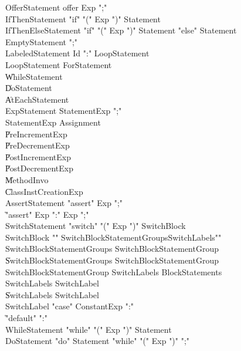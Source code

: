 {\begin{grammar}

 OfferStatement  \: offer Exp \xcd";"\\
 IfThenStatement  \: \xcd"if" \xcd"(" Exp \xcd")" Statement\\
 IfThenElseStatement  \: \xcd"if" \xcd"(" Exp \xcd")" Statement  \xcd"else" Statement \\
 EmptyStatement  \: \xcd";"\\
 LabeledStatement  \: Id \xcd":" LoopStatement\\
 LoopStatement  \: ForStatement\\
    \| WhileStatement\\
    \| DoStatement\\
    \| AtEachStatement\\
 ExpStatement  \: StatementExp \xcd";"\\
 StatementExp  \: Assignment\\
    \| PreIncrementExp\\
    \| PreDecrementExp\\
    \| PostIncrementExp\\
    \| PostDecrementExp\\
    \| MethodInvo\\
    \| ClassInstCreationExp\\
 AssertStatement  \: \xcd"assert" Exp \xcd";"\\
    \| \xcd"assert" Exp  \xcd":" Exp  \xcd";"\\
 SwitchStatement  \: \xcd"switch" \xcd"(" Exp \xcd")" SwitchBlock\\
 SwitchBlock  \: \xcd"{" SwitchBlockStatementGroups\opt SwitchLabels\opt \xcd"}"\\
 SwitchBlockStatementGroups  \: SwitchBlockStatementGroup\\
    \| SwitchBlockStatementGroups SwitchBlockStatementGroup\\
 SwitchBlockStatementGroup  \: SwitchLabels BlockStatements\\
 SwitchLabels  \: SwitchLabel\\
    \| SwitchLabels SwitchLabel\\
 SwitchLabel  \: \xcd"case" ConstantExp \xcd":"\\
    \| \xcd"default" \xcd":"\\
 WhileStatement  \: \xcd"while" \xcd"(" Exp \xcd")" Statement\\
 DoStatement  \: \xcd"do" Statement \xcd"while" \xcd"(" Exp \xcd")" \xcd";"\\

\end{grammar}}
